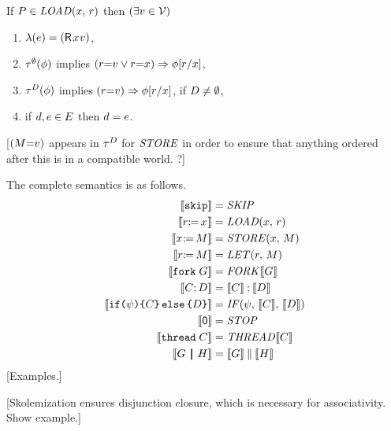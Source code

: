\begin{definition}
  \noindent
  If $\aPS\SB0 \in \sLOAD{\aLoc}{\aReg}$ then
  $(\exists\aVal\in\Val)$
  \begin{enumerate}
  \item $\labelingAct\SB0(\aEv) = \DRP{\aLoc}{\aVal}$,
  \item %
    $\aTr[\emptyset]\SB0(\aForm)$ implies $(\aReg{=}\aVal\lor\aReg{=}\aLoc)\limplies\aForm[\aReg/\aLoc]$,
  \item %
    $\aTr[\bEvs]\SB0(\aForm)$ implies $(\aReg{=}\aVal)\limplies\aForm[\aReg/\aLoc]$, if $\bEvs\neq\emptyset$,
  \item if $\bEv,\aEv\in\aEvs\SB0$ then $\bEv=\aEv$.
  \end{enumerate}
\end{definition}
[$(\aExp{=}\aVal)$ appears in $\aTr[\bEvs]$ for $\sSTORE{}{}$ in order to
ensure that anything ordered after this is in a compatible world. ?]

The complete semantics is as follows.
\begin{align*}
  \sem{\SKIP} &= \sSKIP
  \\
  \sem{\PR{\aLoc}{\aReg}} &= \sLOAD{\aLoc}{\aReg}
  \\
  \sem{\PW{\aLoc}{\aExp}} &= \sSTORE{\aLoc}{\aExp}
  \\
  \sem{\LET{\aReg}{\aExp}} &= \sLET{\aReg}{\aExp}
  \\
  \sem{\FORK{\aGrp}} &= \sFORK{}\sem{\aGrp}
  \\
  \sem{\aCmd \SEMI \bCmd} &= \sem{\aCmd}\sSEMI\sem{\bCmd}
  \\
  \sem{\IF{\bForm}\THEN\aCmd\ELSE\bCmd\FI} &= \sIF{\bForm}\sTHEN\sem{\aCmd}\sELSE\sem{\bCmd}\sFI
  \\
  \sem{\NIL} &= \sSTOP
  \\
  \sem{\THREAD{\aCmd}} &= \sTHREAD{}\sem{\aCmd}
  \\
  \sem{\aGrp \PAR \bGrp} &= \sem{\aGrp}\sPAR\sem{\bGrp}
\end{align*}
[Examples.]


[Skolemization ensures disjunction closure, which is necessary
for associativity. Show example.]

